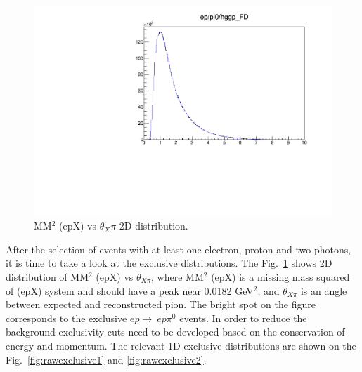 
\begin{figure}
	\vspace*{-0.3cm}
	\includegraphics[page=10,width=0.97\linewidth]{Chapters/Ch4-BaseAnalysis/1_Exclusivity_Cuts/figures/eppi0.exclusive.pdf}
	\caption{MM$^2$ (epX) vs $\theta_X\pi$ 2D distribution.}
	\label{fig:MM2vsThetaXPi}
\end{figure}
After the selection of events with at least one electron, proton and two photons, it is time to take a look at the exclusive distributions.
The Fig.~\ref{fig:MM2vsThetaXPi} shows 2D distribution of MM$^2$ (epX) vs $\theta_{X\pi}$, where MM$^2$ (epX) is a missing mass squared of (epX) system and should have a peak near 0.0182 GeV$^2$, and $\theta_{X\pi}$ is an angle between expected and reconstructed pion.
The bright spot on the figure corresponds to the exclusive $ep\rightarrow~ep\pi^0$ events.
In order to reduce the background exclusivity cuts  need to be developed based on the conservation of energy and momentum.
The relevant 1D exclusive distributions are shown on the Fig.~\ref{fig:rawexclusive1} and \ref{fig:rawexclusive2}.

